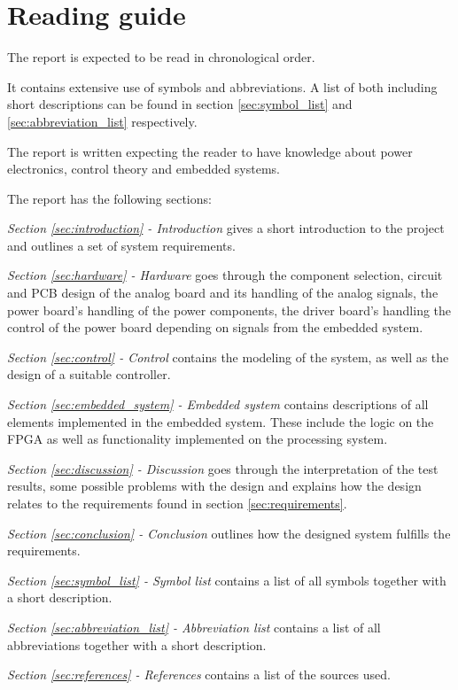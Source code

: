 \section{Reading guide}
The report is expected to be read in chronological order. 

It contains extensive use of symbols and abbreviations. A list of both including short descriptions can be found in section \ref{sec:symbol_list} and \ref{sec:abbreviation_list} respectively. 

The report is written expecting the reader to have knowledge about power electronics, control theory and embedded systems.

\medskip
The report has the following sections:

\medskip
\emph{Section \ref{sec:introduction} - Introduction} gives a short introduction to the project and outlines a set of system requirements.

\medskip
\emph{Section \ref{sec:hardware} - Hardware} goes through the component selection, circuit and PCB design of the analog board and its handling of the analog signals, the power board's handling of the power components, the driver board's handling the control of the power board depending on signals from the embedded system.

\medskip
\emph{Section \ref{sec:control} - Control} contains the modeling of the system, as well as the design of a suitable controller. 

\medskip
\emph{Section \ref{sec:embedded_system} - Embedded system} contains descriptions of all elements implemented in the embedded system. These include the logic on the FPGA as well as functionality implemented on the processing system. 

\medskip
\emph{Section \ref{sec:discussion} - Discussion} goes through the interpretation of the test results, some possible problems with the design and explains how the design relates to the requirements found in section \ref{sec:requirements}.

\medskip
\emph{Section \ref{sec:conclusion} - Conclusion} outlines how the designed system fulfills the requirements.

\medskip
\emph{Section \ref{sec:symbol_list} - Symbol list} contains a list of all symbols together with a short description.

\medskip
\emph{Section \ref{sec:abbreviation_list} - Abbreviation list} contains a list of all abbreviations together with a short description.

\medskip
\emph{Section \ref{sec:references} - References} contains a list of the sources used.


